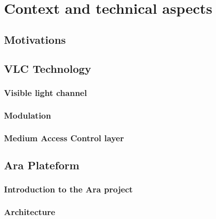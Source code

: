 \chapter{Context and technical aspects}

\label{Context}



\section{Motivations}



\section{VLC Technology}

\subsection{Visible light channel}
\subsection{Modulation}
\subsection{Medium Access Control layer}

\section{Ara Plateform}
\subsection{Introduction to the Ara project}
\subsection{Architecture}